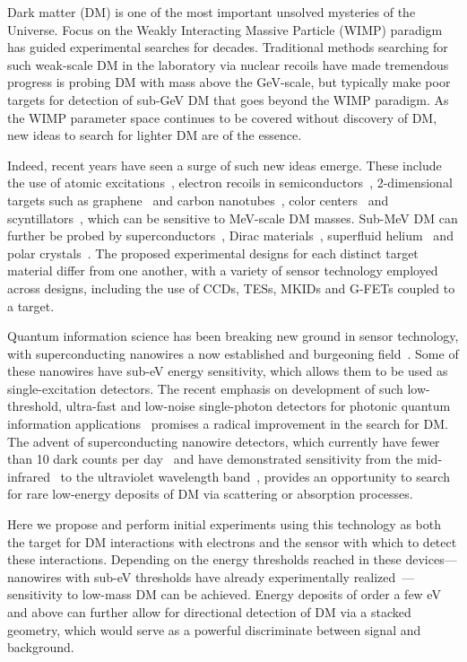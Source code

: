 \documentclass[twocolumn,10pt,prl,nofootinbib,preprintnumbers]{revtex4-1}
\begin{document}
Dark matter (DM) is one of the most important unsolved mysteries of the Universe. Focus on the
Weakly Interacting Massive Particle (WIMP) paradigm has guided
experimental searches for decades. Traditional methods searching for
such weak-scale DM in the laboratory via nuclear recoils have made
tremendous progress is probing DM with mass above the GeV-scale, but
typically make poor targets for detection of sub-GeV DM that goes
beyond the WIMP paradigm. As the WIMP parameter space continues to be
covered without discovery of DM, new ideas to search for lighter DM
are of the essence.

Indeed, recent years have seen a surge of such new ideas
emerge. These include the use of atomic
excitations~\cite{Essig:2011nj}, electron recoils in
semiconductors~\cite{Essig:2011nj,Essig:2012yx,Graham:2012su,Kurinsky:2019pgb},
2-dimensional targets such as graphene~\cite{Hochberg:2016ntt} and
carbon nanotubes~\cite{Cavoto:2017otc}, color
centers~\cite{Budnik:2017sbu} and
scyntillators~\cite{Derenzo:2016fse}, which can be sensitive to
MeV-scale DM masses. Sub-MeV DM can further be probed by
superconductors~\cite{Hochberg:2015pha,Hochberg:2015fth,Hochberg:2016ajh},
Dirac materials~\cite{Hochberg:2017wce}, superfluid
helium~\cite{Schutz:2016tid,Knapen:2016cue} and polar
crystals~\cite{Knapen:2017ekk,Griffin:2018bjn}.  The proposed
experimental designs for each distinct target material differ from one
another, with a variety of sensor technology employed across designs,
including the use of CCDs, TESs, MKIDs and G-FETs coupled to a target.

Quantum information science has been breaking new ground in sensor
technology, with superconducting nanowires a now established and
burgeoning field~\cite{Natarajan2012, Hadfield2009, Najafi2016}.  Some
of these nanowires have sub-eV energy sensitivity, which allows them
to be used as single-excitation detectors.  The recent emphasis on
development of such low-threshold, ultra-fast and low-noise
single-photon detectors for photonic quantum information
applications~\cite{Takes2007,Calkins2013} promises a radical
improvement in the search for DM.  The advent of superconducting
nanowire detectors, which currently have fewer than 10 dark counts per
day~\cite{Wollman2017} and have demonstrated sensitivity from the
mid-infrared~\cite{Marsili2012} to the ultraviolet wavelength
band~\cite{Wollman2017}, provides an opportunity to search for rare
low-energy deposits of DM via scattering or absorption processes.

Here we propose and perform initial experiments using this technology as both the target for DM
interactions with electrons and the sensor with which to detect
these interactions. Depending on the energy thresholds reached in
these devices---nanowires with sub-eV thresholds have already
experimentally realized~\cite{Marsili2012}---sensitivity to low-mass DM
can be achieved. Energy deposits of order a few eV and above can
further allow for directional detection of DM via a stacked geometry,
which would serve as a powerful discriminate between signal and
background.
\end{document}

